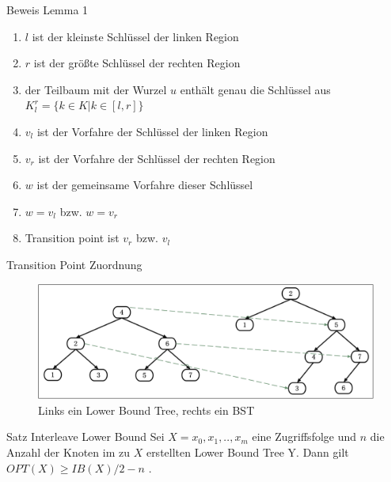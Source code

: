 \documentclass[11pt]{beamer}
\begin{document}
\begin{frame} {Beweis Lemma 1}
	\begin{enumerate}
			\item  $l$	ist der kleinste Schlüssel der linken Region
		\item  $r$	ist der größte Schlüssel der rechten Region
		\pause
		\item der Teilbaum mit der Wurzel $u$ enthält genau die Schlüssel aus $K^r_l = \{k \in K \vert k \in \left[l,r\right]\}$
		\pause
		\item  $v_l$ ist der Vorfahre der Schlüssel der linken Region
		\item  $v_r$ ist der Vorfahre der Schlüssel der rechten Region
		\item  $w$ ist der gemeinsame Vorfahre dieser Schlüssel
		\item  $w = v_l$ bzw. $w = v_r$	
		\item  Transition point ist $v_r$ bzw. $v_l$ 
	\end{enumerate}	
\end{frame}
\begin{frame} {Transition Point Zuordnung}
	\begin{figure}[H]
		\centering
		\includegraphics[width=1\textwidth]{"Medien/pres/transitionPoints"}
		\caption{Links ein Lower Bound Tree, rechts ein BST }
	\end{figure}
\end{frame}

\begin{frame} {Satz Interleave Lower Bound}
		Sei $X = x_0, x_1,.., x_m$  eine Zugriffsfolge und $n$ die Anzahl der Knoten im zu $X$ erstellten Lower Bound Tree Y. Dann gilt\\	
	$\mathit{OPT}\left(X\right) \geq \mathit{IB}\left(X\right) /2 - n$ .
	
\end{frame}
\end{document}
